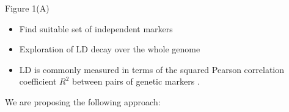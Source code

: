 \documentclass[a0paper,portrait]{baposter}
\begin{document}
\begin{poster}
{\begin{minipage}{0.3 \textwidth}
%
\end{minipage}
%
\hspace{0.4cm}
\begin{minipage}{0.33 \textwidth}
Figure 1(A)
\end{minipage}
%
\hfill
\begin{minipage}{0.3 \textwidth}
\begin{itemize}[leftmargin=*]
	\item Find suitable set of independent markers 
	\item Exploration of LD decay over the whole genome
	\item LD is commonly measured in terms of the squared Pearson correlation coefficient $R^2$ between pairs 
		of genetic markers \citep{Hill1968}. 
\end{itemize}
We are proposing the following approach:
\begin{itemize}[leftmargin=*]

\end{itemize}
\end{minipage}}
\end{poster}
\end{document}
